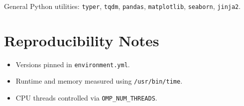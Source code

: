 \documentclass[a4paper,11pt]{article}
\begin{document}
General Python utilities: \texttt{typer}, \texttt{tqdm}, \texttt{pandas}, \texttt{matplotlib}, \texttt{seaborn}, \texttt{jinja2}.

\section{Reproducibility Notes}
\begin{itemize}
    \item Versions pinned in \texttt{environment.yml}.
    \item Runtime and memory measured using \texttt{/usr/bin/time}.
    \item CPU threads controlled via \texttt{OMP\_NUM\_THREADS}.
\end{itemize}
\end{document}
